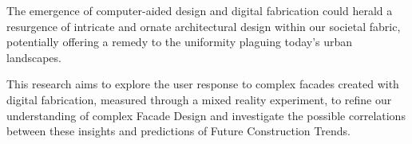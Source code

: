 







The emergence of computer-aided design and digital fabrication could herald a resurgence of intricate and ornate architectural design within our societal fabric, potentially offering a remedy to the uniformity plaguing today's urban landscapes.

This research aims to explore the user response to complex facades created with digital fabrication, measured through a mixed reality experiment, to refine our understanding of complex Facade Design and investigate the possible correlations between these insights and predictions of Future Construction Trends.

